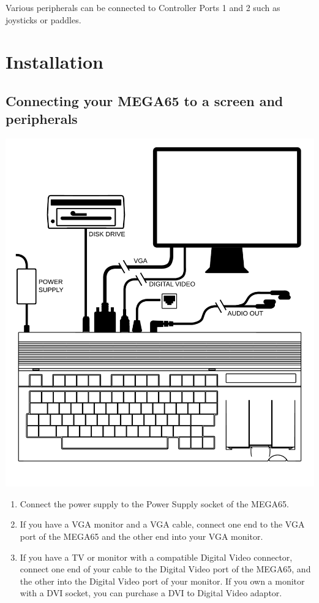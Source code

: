 Various peripherals can be connected to Controller Ports 1 and 2 such as joysticks or paddles.

\newpage

\section{Installation}

\subsection{Connecting your MEGA65 to a screen and peripherals}

\includegraphics[width=\linewidth]{images/illustrations/mega65-top.pdf}

\newpage

\begin{enumerate}
	\item Connect the power supply to the Power Supply socket of the MEGA65.
	\item If you have a VGA monitor and a VGA cable, connect one end to the VGA port of the MEGA65 and the other end into your VGA monitor.
	\item If you have a TV or monitor with a compatible Digital Video connector, connect one end of your cable to the Digital Video port of the MEGA65, and the other into the Digital Video port of your monitor. If you own a monitor with a DVI socket, you can purchase a DVI to Digital Video adaptor.
\end{enumerate}

